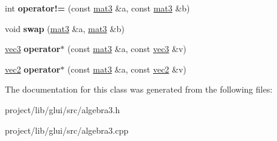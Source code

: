\begin{DoxyCompactItemize}
\item 
\hypertarget{classmat3_a8716eb2c3905a861aefd96b32f36ded0}{int {\bfseries operator!=} (const \hyperlink{classmat3}{mat3} \&a, const \hyperlink{classmat3}{mat3} \&b)}\label{classmat3_a8716eb2c3905a861aefd96b32f36ded0}

\item 
\hypertarget{classmat3_ac0ca53f4f00e55a17cccd57bd66b29c8}{void {\bfseries swap} (\hyperlink{classmat3}{mat3} \&a, \hyperlink{classmat3}{mat3} \&b)}\label{classmat3_ac0ca53f4f00e55a17cccd57bd66b29c8}

\item 
\hypertarget{classmat3_a46bbeb7eed270ad69b34c3a1b93eb050}{\hyperlink{classvec3}{vec3} {\bfseries operator$\ast$} (const \hyperlink{classmat3}{mat3} \&a, const \hyperlink{classvec3}{vec3} \&v)}\label{classmat3_a46bbeb7eed270ad69b34c3a1b93eb050}

\item 
\hypertarget{classmat3_a307ae299187b6d9e75b1a7730b6213c2}{\hyperlink{classvec2}{vec2} {\bfseries operator$\ast$} (const \hyperlink{classmat3}{mat3} \&a, const \hyperlink{classvec2}{vec2} \&v)}\label{classmat3_a307ae299187b6d9e75b1a7730b6213c2}

\end{DoxyCompactItemize}


The documentation for this class was generated from the following files\-:\begin{DoxyCompactItemize}
\item 
project/lib/glui/src/algebra3.\-h\item 
project/lib/glui/src/algebra3.\-cpp\end{DoxyCompactItemize}
